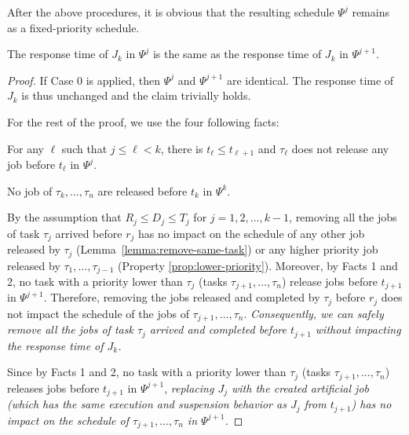 After the above procedures, it is obvious that the resulting schedule $\Psi^j$ remains as a fixed-priority schedule.
\begin{Lemma}
\label{lemma:psij}
The response time of $J_k$ in $\Psi^j$ is the same as the response time of $J_k$ in $\Psi^{j+1}$.
\end{Lemma}
\begin{proof}
If Case 0 is applied, then $\Psi^j$ and $\Psi^{j+1}$ are identical. The response time of $J_k$ is thus unchanged and the claim trivially holds.

For the rest of the proof, we use the four following facts:

 For any $\ell$ such that $j \leq \ell < k$, there is $t_\ell \leq t_{\ell+1}$ and $\tau_\ell$ does not release any job before $t_\ell$ in $\Psi^j$.

 No job of $\tau_k, \ldots, \tau_n$ are released before $t_k$ in $\Psi^k$.

 By the assumption that $R_j \leq D_j \leq T_j$ for $j=1,2,\ldots,k-1$, removing all the jobs of task $\tau_j$ arrived before $r_j$ has no impact on the schedule of any other job released by $\tau_j$ (Lemma~\ref{lemma:remove-same-task}) or any higher priority job released by $\tau_1, \ldots, \tau_{j-1}$ (Property \ref{prop:lower-priority}). Moreover, by Facts 1 and 2, no task with a priority lower than $\tau_j$ (tasks $\tau_{j+1}, \ldots, \tau_n$) release jobs before $t_{j+1}$ in $\Psi^{j+1}$. Therefore, removing the jobs released and completed by $\tau_j$ before $r_j$ does not impact the schedule of the jobs of $\tau_{j+1}, \ldots, \tau_{n}$. \emph{Consequently, we can safely remove all the jobs of task $\tau_j$ arrived and completed before $t_{j+1}$ without impacting the response time of $J_{k}$.}

 Since by Facts 1 and 2, no task with a priority lower than $\tau_j$ (tasks $\tau_{j+1}, \ldots, \tau_n$) releases jobs before $t_{j+1}$ in $\Psi^{j+1}$, \emph{replacing $J_j$ with the created artificial job (which has the same execution and suspension behavior as $J_j$ from $t_{j+1}$) has no impact on the schedule of $\tau_{j+1}, \ldots, \tau_n$ in $\Psi^{j+1}$.}


\end{proof}
